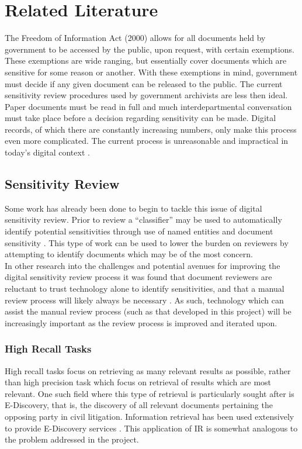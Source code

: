 \documentclass{l4proj}
\begin{document}
\chapter{Related Literature} \label{relatedliterature}
The Freedom of Information Act (2000) allows for all documents held by government to be accessed by the public, upon request, with certain exemptions. These exemptions are wide ranging, but essentially cover documents which are sensitive for some reason or another. With these exemptions in mind, government must decide if any given document can be released to the public.
The current sensitivity review procedures used by government archivists are less then ideal. Paper documents must be read in full and much interdepartmental conversation must take place before a decision regarding sensitivity can be made. Digital records, of which there are constantly increasing numbers, only make this process even more complicated. The current process is unreasonable and impractical in today's digital context \cite{allan2014record}.

\section{Sensitivity Review}
Some work has already been done to begin to tackle this issue of digital sensitivity review. Prior to review a ``classifier'' may be used to automatically identify potential sensitivities through use of named entities and document sensitivity \cite{mcdonald2014towards}. This type of work can be used to lower the burden on reviewers by attempting to identify documents which may be of the most concern. \\
In other research into the challenges and potential avenues for improving the digital sensitivity review process it was found that document reviewers are reluctant to trust technology alone to identify sensitivities, and that a manual review process will likely always be necessary \cite{gollins2014using}. 
As such, technology which can assist the manual review process (such as that developed in this project) will be increasingly important as the review process is improved and iterated upon.

\subsection{High Recall Tasks}
High recall tasks focus on retrieving as many relevant results as possible, rather than high precision task which focus on retrieval of results which are most relevant.
One such field where this type of retrieval is particularly sought after is E-Discovery, that is, the discovery of all relevant documents pertaining the opposing party in civil litigation. Information retrieval has been used extensively to provide E-Discovery services \cite{oard2013information}. This application of IR is somewhat analogous to the problem addressed in the project. \\ \\
\end{document}
